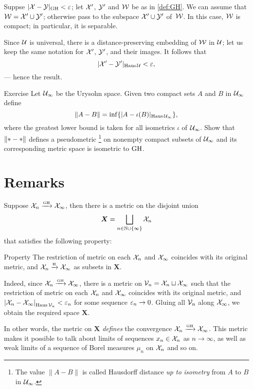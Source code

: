 Suppse $|\mathcal{X}-\mathcal{Y}|_{\operatorname{\rm GH}\nolimits}<\varepsilon$;
let $\mathcal{X}'$, $\mathcal{Y}'$ and $\mathcal{W}$ be as in \ref{def:GH}.
We can assume that $\mathcal{W}=\mathcal{X}'\cup\mathcal{Y}'$;
otherwise pass to the subspace $\mathcal{X}'\cup\mathcal{Y}'$ of~$\mathcal{W}$.
In this case, $\mathcal{W}$ is compact;
in particular, it is separable.

Since $\mathcal{U}$ is universal, there is a distance-preserving embedding of $\mathcal{W}$ in $\mathcal{U}$;
let us keep the same notation for $\mathcal{X}'$, $\mathcal{Y}'$, and their images.
It follows that 
\[|\mathcal{X}'-\mathcal{Y}'|_{\operatorname{\rm Haus}\nolimits\mathcal{U}}<\varepsilon,\]
--- hence the result.
\qeds

\begin{thm}{Exercise}\label{ex:GH-urysohn}
Let $\mathcal{U}_\infty$ be the Urysohn space.
Given two compact sets $A$ and $B$ in $\mathcal{U}_\infty$ define 
\[\|A-B\|=\inf\{|A-\iota(B)|_{\operatorname{\rm Haus}\nolimits\mathcal{U}_\infty}\},\]
where the greatest lower bound is taken for all isometrics $\iota$ of $\mathcal{U}_\infty$.
Show that $\|{*}\z-{*}\|$ defines a pseudometric%
\footnote{The value $\|A-B\|$ is called Hausdorff distance \emph{up to isometry} from $A$ to $B$ in $\mathcal{U}_\infty$.}
on nonempty compact subsets of $\mathcal{U}_\infty$ and its corresponding metric space is isometric to $\operatorname{\rm GH}\nolimits$.
\end{thm}

\section{Remarks}

Suppose $\mathcal{X}_n\xrightarrow{\mbox{\tiny\rm GH}} \mathcal{X}_\infty$, then there is a metric on the disjoint union 
\[\bm{X}=\bigsqcup_{n\in \mathbb{N}\cup\{\infty\}} \mathcal{X}_n\] 
that satisfies the following property:

\begin{thm}{Property}\label{propery:GH}
The restriction of metric on each $\mathcal{X}_n$ and $\mathcal{X}_\infty$ coincides with its original metric, 
and $\mathcal{X}_n\xrightarrow{\mbox{\tiny\rm H}} \mathcal{X}_\infty$ as subsets in $\bm{X}$.
\end{thm}

Indeed, since $\mathcal{X}_n\xrightarrow{\mbox{\tiny\rm GH}} \mathcal{X}_\infty$, there is a metric on $\mathcal{V}_n=\mathcal{X}_n\sqcup \mathcal{X}_\infty$ such that the restriction of metric on each $\mathcal{X}_n$ and $\mathcal{X}_\infty$ coincides with its original metric, and $\dist{\spc{X}_n}{\spc{X}_\infty}{\Haus\spc{V}_n}<\eps_n$ for some sequence $\varepsilon_n\to 0$.
Gluing all $\mathcal{V}_n$ along $\mathcal{X}_\infty$, we obtain the required space $\bm{X}$.

In other words, the metric on $\bm{X}$ \textit{defines} the convergence $\spc{X}_n\z\GHto \spc{X}_\infty$.
This metric makes it possible to talk about limits of sequences $x_n\in \mathcal{X}_n$ as $n\to\infty$, as well as weak limits of a sequence of Borel measures $\mu_n$ on $\mathcal{X}_n$ and so on.

